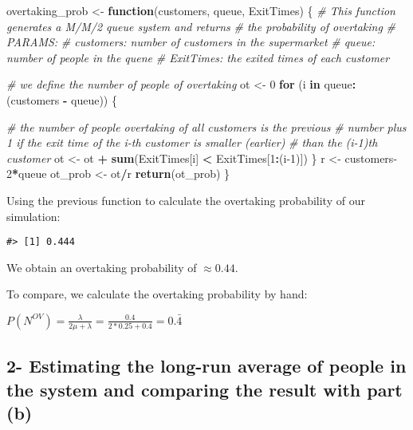 \documentclass[]{article}
\newenvironment{Shaded}{\begin{snugshade}}{\end{snugshade}}
\newcommand{\CommentTok}[1]{\textcolor[rgb]{0.56,0.35,0.01}{\textit{#1}}}
\newcommand{\ControlFlowTok}[1]{\textcolor[rgb]{0.13,0.29,0.53}{\textbf{#1}}}
\newcommand{\DecValTok}[1]{\textcolor[rgb]{0.00,0.00,0.81}{#1}}
\newcommand{\KeywordTok}[1]{\textcolor[rgb]{0.13,0.29,0.53}{\textbf{#1}}}
\newcommand{\NormalTok}[1]{#1}
\newcommand{\OperatorTok}[1]{\textcolor[rgb]{0.81,0.36,0.00}{\textbf{#1}}}
\newcommand{\StringTok}[1]{\textcolor[rgb]{0.31,0.60,0.02}{#1}}
\begin{document}
\begin{Shaded}
\begin{Highlighting}[]
\NormalTok{overtaking_prob <-}\StringTok{ }\ControlFlowTok{function}\NormalTok{(customers, queue, ExitTimes) \{}
  \CommentTok{# This function generates a M/M/2 queue system and returns }
  \CommentTok{# the probability of overtaking}
  \CommentTok{# PARAMS:}
  \CommentTok{# customers:   number of customers in the supermarket}
  \CommentTok{# queue:       number of people in the quene}
  \CommentTok{# ExitTimes:   the exited times of each customer}

  \CommentTok{# we define the number of people of overtaking}
\NormalTok{  ot <-}\StringTok{ }\DecValTok{0}
  \ControlFlowTok{for}\NormalTok{ (i }\ControlFlowTok{in}\NormalTok{ queue}\OperatorTok{:}\NormalTok{(customers }\OperatorTok{-}\StringTok{ }\NormalTok{queue)) \{}

    \CommentTok{# the number of people overtaking of all customers is the previous }
    \CommentTok{# number plus 1 if the exit time of the i-th customer is smaller (earlier) }
    \CommentTok{# than the (i-1)th customer }
\NormalTok{    ot <-}\StringTok{ }\NormalTok{ot }\OperatorTok{+}\StringTok{ }\KeywordTok{sum}\NormalTok{(ExitTimes[i] }\OperatorTok{<}\StringTok{ }\NormalTok{ExitTimes[}\DecValTok{1}\OperatorTok{:}\NormalTok{(i}\DecValTok{-1}\NormalTok{)])}
\NormalTok{  \}}
\NormalTok{  r <-}\StringTok{ }\NormalTok{customers}\DecValTok{-2}\OperatorTok{*}\NormalTok{queue}
\NormalTok{  ot_prob <-}\StringTok{ }\NormalTok{ot}\OperatorTok{/}\NormalTok{r}
  \KeywordTok{return}\NormalTok{(ot_prob)}
\NormalTok{\}}
\end{Highlighting}
\end{Shaded}

Using the previous function to calculate the overtaking probability of
our simulation:

\begin{verbatim}
#> [1] 0.444
\end{verbatim}

We obtain an overtaking probability of \(\approx 0.44\).

To compare, we calculate the overtaking probability by hand:

\(P(N^{OV}) = \frac{\lambda}{2 \mu + \lambda} = \frac{0.4}{2 * 0.25 + 0.4} = 0. \bar{4}\)

\newpage

\hypertarget{estimating-the-long-run-average-of-people-in-the-system-and-comparing-the-result-with-part-b}{%
\subsection{2- Estimating the long-run average of people in the system
and comparing the result with part
(b)}\label{estimating-the-long-run-average-of-people-in-the-system-and-comparing-the-result-with-part-b}}
\end{document}
